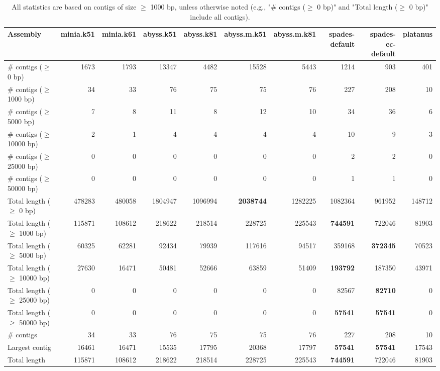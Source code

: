 \documentclass[12pt,a4paper]{article}
\begin{document}
\begin{table}[ht]
\begin{center}
\caption{All statistics are based on contigs of size $\geq$ 1000 bp, unless otherwise noted (e.g., "\# contigs ($\geq$ 0 bp)" and "Total length ($\geq$ 0 bp)" include all contigs).}
\begin{tabular}{|l*{9}{|r}|}
\hline
Assembly & minia.k51 & minia.k61 & abyss.k51 & abyss.k81 & abyss.m.k51 & abyss.m.k81 & spades-default & spades-ec-default & platanus \\ \hline
\# contigs ($\geq$ 0 bp) & 1673 & 1793 & 13347 & 4482 & 15528 & 5443 & 1214 & 903 & 401 \\ \hline
\# contigs ($\geq$ 1000 bp) & 34 & 33 & 76 & 75 & 75 & 76 & 227 & 208 & 10 \\ \hline
\# contigs ($\geq$ 5000 bp) & 7 & 8 & 11 & 8 & 12 & 10 & 34 & 36 & 6 \\ \hline
\# contigs ($\geq$ 10000 bp) & 2 & 1 & 4 & 4 & 4 & 4 & 10 & 9 & 3 \\ \hline
\# contigs ($\geq$ 25000 bp) & 0 & 0 & 0 & 0 & 0 & 0 & 2 & 2 & 0 \\ \hline
\# contigs ($\geq$ 50000 bp) & 0 & 0 & 0 & 0 & 0 & 0 & 1 & 1 & 0 \\ \hline
Total length ($\geq$ 0 bp) & 478283 & 480058 & 1804947 & 1096994 & {\bf 2038744} & 1282225 & 1082364 & 961952 & 148712 \\ \hline
Total length ($\geq$ 1000 bp) & 115871 & 108612 & 218622 & 218514 & 228725 & 225543 & {\bf 744591} & 722046 & 81903 \\ \hline
Total length ($\geq$ 5000 bp) & 60325 & 62281 & 92434 & 79939 & 117616 & 94517 & 359168 & {\bf 372345} & 70523 \\ \hline
Total length ($\geq$ 10000 bp) & 27630 & 16471 & 50481 & 52666 & 63859 & 51409 & {\bf 193792} & 187350 & 43971 \\ \hline
Total length ($\geq$ 25000 bp) & 0 & 0 & 0 & 0 & 0 & 0 & 82567 & {\bf 82710} & 0 \\ \hline
Total length ($\geq$ 50000 bp) & 0 & 0 & 0 & 0 & 0 & 0 & {\bf 57541} & {\bf 57541} & 0 \\ \hline
\# contigs & 34 & 33 & 76 & 75 & 75 & 76 & 227 & 208 & 10 \\ \hline
Largest contig & 16461 & 16471 & 15535 & 17795 & 20368 & 17797 & {\bf 57541} & {\bf 57541} & 17543 \\ \hline
Total length & 115871 & 108612 & 218622 & 218514 & 228725 & 225543 & {\bf 744591} & 722046 & 81903 \\ \hline

\end{tabular}
\end{center}
\end{table}
\end{document}
